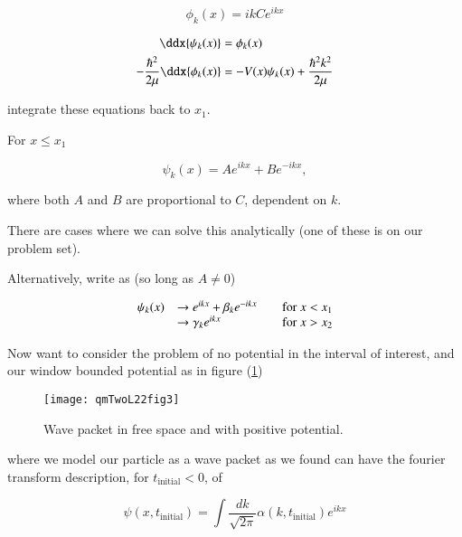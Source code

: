\begin{equation}\label{eqn:qmTwoL22:70}
\phi_k(x) = i k C e^{i k x}
\end{equation}

\begin{align}\label{eqn:qmTwoL22:90}
\ddx{\psi_k(x)} &= \phi_k(x) \\
-\frac{\hbar^2}{2 \mu} \ddx{\phi_k(x)} &= - V(x) \psi_k(x) + \frac{\hbar^2 k^2}{2 \mu}
\end{align}

integrate these equations back to $x_1$.

For $x \le x_1$

\begin{equation}\label{eqn:qmTwoL22:110}
\psi_k(x) = A e^{i k x} + B e^{-i k x},
\end{equation}

where both $A$ and $B$ are proportional to $C$, dependent on $k$.

There are cases where we can solve this analytically (one of these is on our problem set).

Alternatively, write as (so long as $A \ne 0$)

\begin{equation}\label{eqn:qmTwoL22:130}
\begin{array}{l l l}
\psi_k(x)
&\rightarrow e^{i k x} + \beta_k e^{-i k x} & \quad \mbox{for $x < x_1$} \\
&\rightarrow \gamma_k e^{i k x} & \quad \mbox{for $x > x_2$}
\end{array}
\end{equation}

Now want to consider the problem of no potential in the interval of interest, and our window bounded potential as in figure (\ref{fig:qmTwoL22:qmTwoL22fig3})

\begin{figure}[htp]
   \centering
   \texttt{[image: qmTwoL22fig3]}
   \caption{Wave packet in free space and with positive potential.}\label{fig:qmTwoL22:qmTwoL22fig3}
\end{figure}

where we model our particle as a wave packet as we found can have the fourier transform description, for $t_{\text{initial}} < 0$, of

\begin{equation}\label{eqn:qmTwoL22:150}
\psi(x, t_{\text{initial}}) = \int \frac{dk}{\sqrt{2 \pi}} \alpha(k, t_{\text{initial}}) e^{i k x}
\end{equation}

